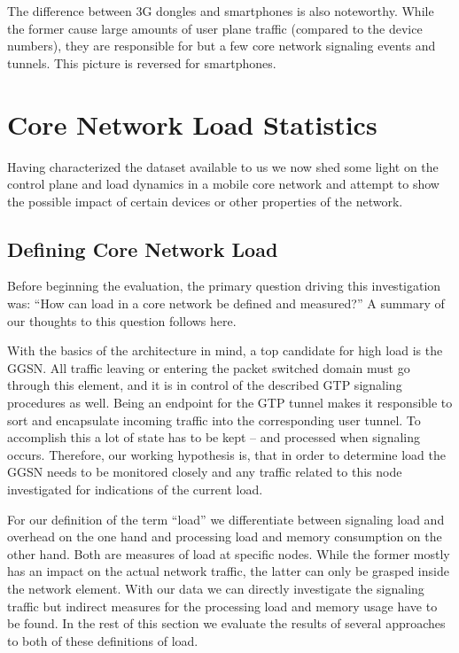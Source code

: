 The difference between 3G dongles and smartphones is also noteworthy. While the former cause large amounts of user plane traffic (compared to the device numbers), they are responsible for but a few core network signaling events and tunnels. This picture is reversed for smartphones.


\section{Core Network Load Statistics}
\label{sec:tunnelstats-IMC}

Having characterized the dataset available to us we now shed some light on the control plane and load dynamics in a mobile core network and attempt to show the possible impact of certain devices or other properties of the network. 


\subsection{Defining Core Network Load}

Before beginning the evaluation, the primary question driving this investigation was: ``How can load in a core network be defined and measured?'' A summary of our thoughts to this question follows here.

With the basics of the architecture in mind, a top candidate for high load is the \ac{GGSN}. All traffic leaving or entering the packet switched domain must go through this element, and it is in control of the described GTP signaling procedures as well. Being an endpoint for the GTP tunnel makes it responsible to sort and encapsulate incoming traffic into the corresponding user tunnel. To accomplish this a lot of state has to be kept -- and processed when signaling occurs. Therefore, our working hypothesis is, that in order to determine load the \ac{GGSN} needs to be monitored closely and any traffic related to this node investigated for indications of the current load.

For our definition of the term ``load'' we differentiate between signaling load and overhead on the one hand and processing load and memory consumption on the other hand. Both are measures of load at specific nodes. While the former mostly has an impact on the actual network traffic, the latter can only be grasped inside the network element. With our data we can directly investigate the signaling traffic but indirect measures for the processing load and memory usage have to be found. In the rest of this section we evaluate the results of several approaches to both of these definitions of load.

